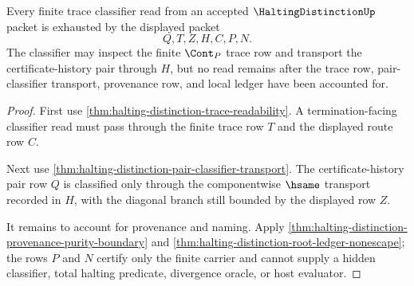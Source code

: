 \begin{theorem}
\label{thm:halting-distinction-root-finite-trace-classifier-exhaustion}
Every finite trace classifier read from an accepted $\HaltingDistinctionUp$ packet is exhausted by the displayed packet
$$
Q,T,Z,H,C,P,N.
$$
The classifier may inspect the finite $\Cont_P$ trace row and transport the certificate-history pair through $H$, but no read remains after the trace row, pair-classifier transport, provenance row, and local ledger have been accounted for.
\end{theorem}
\begin{proof}
First use \autoref{thm:halting-distinction-trace-readability}. A termination-facing classifier read must pass through the finite trace row $T$ and the displayed route row $C$.

Next use \autoref{thm:halting-distinction-pair-classifier-transport}. The certificate-history pair row $Q$ is classified only through the componentwise $\hsame$ transport recorded in $H$, with the diagonal branch still bounded by the displayed row $Z$.

It remains to account for provenance and naming. Apply \autoref{thm:halting-distinction-provenance-purity-boundary} and \autoref{thm:halting-distinction-root-ledger-nonescape}; the rows $P$ and $N$ certify only the finite carrier and cannot supply a hidden classifier, total halting predicate, divergence oracle, or host evaluator.
\end{proof}


